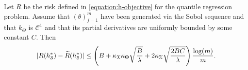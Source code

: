 \begin{lemma} \label{lemma:hardy_krause} Let $R$ be the risk defined in
\cref{equation:h-objective} for the quantile regression problem. Assume that
$(\theta)_{j=1}^m$ have been generated via the Sobol sequence and that
$k_{\Theta}$ is $\mathcal{C}^1$ and that its partial derivatives are uniformly
bounded by some constant $C$.
  Then
    \begin{align}
      |R(h^{*}_{\mathcal{S}}) - \widetilde{R}(h^{*}_{\mathcal{S}})| \leq
      \left (B + \kappa_{\mathcal{X}} \kappa_{\Theta} \sqrt{\frac{B}{\lambda}} + 2\kappa_{\mathcal{X}} \sqrt{\frac{2BC}{\lambda}} \right) \frac{\log(m)}{m}.
    \end{align}
  \end{lemma}
